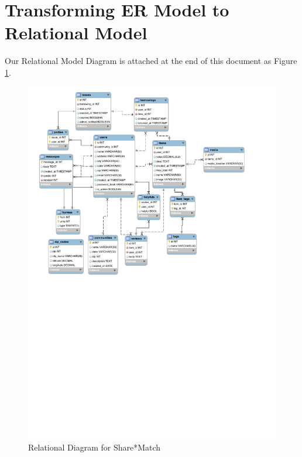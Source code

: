 \documentclass{acm_proc_article-sp}
\begin{document}
\section{Transforming ER Model to Relational Model}
Our Relational Model Diagram is attached at the end of this document as Figure \ref{fig:RelationalDiagram}.
\begin{figure}[p]
    \includegraphics[width=\textwidth]{EECS341Relational.pdf}
    \caption{Relational Diagram for Share*Match}
    \label{fig:RelationalDiagram}
\end{figure}
\end{document}
